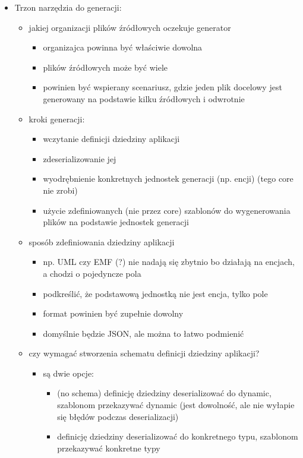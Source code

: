 \begin{itemize}
 \item Trzon narzędzia do generacji:
  \begin{itemize}
   \item jakiej organizacji plików źródłowych oczekuje generator
    \begin{itemize}
     \item organizajca powinna być właściwie dowolna
     \item plików źródłowych może być wiele
     \item powinien być wspierany scenariusz, gdzie jeden plik docelowy jest generowany na podstawie kilku źródłowych i odwrotnie
    \end{itemize}
   \item kroki generacji:
    \begin{itemize}
     \item wczytanie definicji dziedziny aplikacji
     \item zdeserializowanie jej
     \item wyodrębnienie konkretnych jednostek generacji (np. encji) (tego core nie zrobi)
     \item użycie zdefiniowanych (nie przez core) szablonów do wygenerowania plików na podstawie jednostek generacji
    \end{itemize}
   \item sposób zdefiniowania dziedziny aplikacji
    \begin{itemize}
     \item np. UML czy EMF (?) nie nadają się zbytnio bo działają na encjach, a chodzi o pojedyncze pola
     \item podkreślić, że podstawową jednostką nie jest encja, tylko pole
     \item format powinien być zupełnie dowolny
     \item domyślnie będzie JSON, ale można to łatwo podmienić
    \end{itemize}
   \item czy wymagać stworzenia schematu definicji dziedziny aplikacji?
    \begin{itemize}
     \item są dwie opcje:
      \begin{itemize}
       \item (no schema) definicję dziedziny deserializować do dynamic, szablonom przekazywać dynamic (jest dowolność, ale nie wyłapie się błędów podczas deserializacji)
       \item definicję dziedziny deserializować do konkretnego typu, szablonom przekazywać konkretne typy

\end{itemize}
\end{itemize}
\end{itemize}
\end{itemize}
